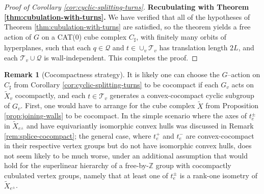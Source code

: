 \documentclass[11pt,oneside]{amsart}
\newcounter{ax}
\theoremstyle{definition}
\newtheorem{rem}[thm]{Remark}
\newcommand{\field}[1]{\mathbb{#1}}
\newcommand{\integers}{\ensuremath{\field{Z}}}
\begin{document}
\begin{proof}[Proof of Corollary \ref{cor:cyclic-splitting-turns}]
\textbf{Recubulating with Theorem \ref{thm:cubulation-with-turns}.}  We have verified that all of the hypotheses of Theorem \ref{thm:cubulation-with-turns} are satisfied, so the theorem yields a free action of $G$ on a CAT(0) cube complex $C_\sharp$, with finitely many orbits of hyperplanes, such that each $q\in\mathcal Q$ and $t\in\cup_v\mathcal T_v$ has translation length $2L$, and each $\mathcal T_v\cup\mathcal Q$ is wall-independent.  This completes the proof.
\end{proof}

\begin{rem}[Cocompactness strategy]\label{rem:cocompactness}
It is likely one can choose the $G$--action on $C_\sharp$ from Corollary \ref{cor:cyclic-splitting-turns} to be cocompact if each $G_v$ acts on $\widetilde X_v$ cocompactly, and each $t\in \mathcal T_v$ generates a convex-cocompact cyclic subgroup of $G_v$.  First, one would have to arrange for the cube complex $\widetilde X$ from Proposition \ref{prop:joining-walls} to be cocompact.  In the simple scenario where the axes of $t_e^{\pm}$ in $\widetilde X_{e^\pm}$ and  have equivariantly isomorphic convex hulls was discussed in Remark \ref{rem:splice-cocompact}; the general case, where $t_e^+$ and $t_e^-$ are convex-cocompact in their respective vertex groups but do not have isomorphic convex hulls, does not seem likely to be much worse, under an additional assumption that would hold for the superlinear hierarchy of a free-by-$\integers$ group with cocompactly cubulated vertex groups, namely that at least one of $t_e^\pm$ is a rank-one isometry of $\widetilde X_{e^\pm}$.  


\end{rem}
\end{document}
